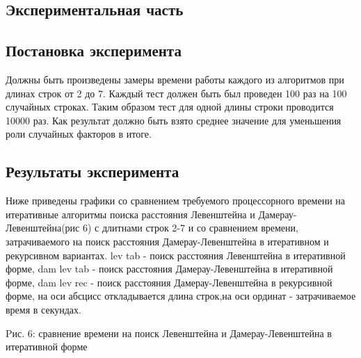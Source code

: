 \documentclass[a4paper, 14pt]{article}
\begin{document}
    \begin{center}
    	\newpage
        \section{Экспериментальная часть}
		\subsection{Постановка эксперимента}
		\begin{flushleft}
		\parindent=1cm
		Должны быть произведены замеры времени работы каждого из алгоритмов при длинах строк от 2 до 7. Каждый тест должен быть был проведен 100 раз на 100 случайных строках. Таким образом тест для одной длины строки проводится 10000 раз. Как результат должно быть взято среднее значение для уменьшения роли случайных факторов в итоге.\\
		\end{flushleft}		
		\subsection{Результаты эксперимента}		
		\begin{flushleft}
		Ниже приведены графики со сравнением требуемого процессорного времени на итеративные алгоритмы поиска расстояния Левенштейна и Дамерау-Левенштейна(рис 6) с длитнами строк 2-7 и со сравнением времени, затрачиваемого на поиск расстояния Дамерау-Левенштейна в итеративном и рекурсивном вариантах.	lev tab - поиск расстояния  Левенштейна в итеративной форме,		dam lev tab - поиск расстояния Дамерау-Левенштейна в итеративной форме,
		dam lev rec - поиск расстояния Дамерау-Левенштейна в рекурсивной форме,
		на оси абсцисс откладывается длина строк,на оси ординат - затрачиваемое время в секундах. 
				\end{flushleft}
\begin{center}
Pис. 6: сравнение времени на поиск Левенштейна и Дамерау-Левенштейна в итеративной форме
\end{center}
\begin{tikzpicture}


\end{tikzpicture}
\end{center}
\end{document}
